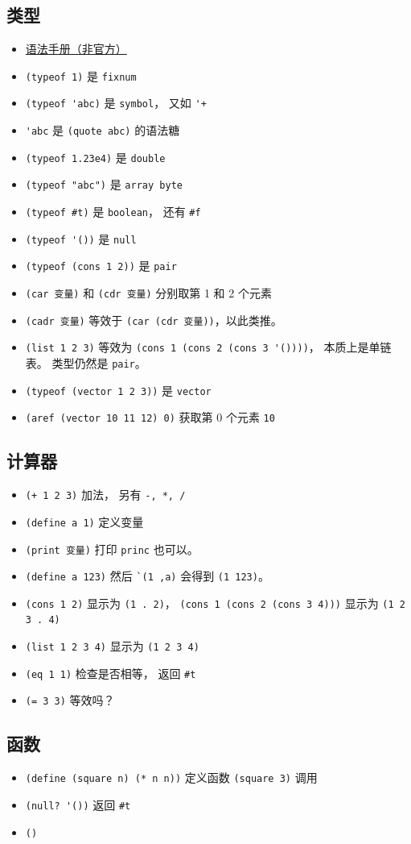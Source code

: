 
\subsection{类型}
\begin{itemize}
\item \href{https://code.google.com/archive/p/femtolisp/wikis/Manual.wiki}{语法手册（非官方）}
\item \verb`(typeof 1)` 是 \verb`fixnum`
\item \verb`(typeof 'abc)` 是 \verb`symbol`， 又如 \verb`'+`
\item \verb`'abc` 是 \verb`(quote abc)` 的语法糖
\item \verb`(typeof 1.23e4)` 是 \verb`double`
\item \verb`(typeof "abc")` 是 \verb`array byte`
\item \verb`(typeof #t)` 是 \verb`boolean`， 还有 \verb`#f`
\item \verb`(typeof '())` 是 \verb`null`
\item \verb`(typeof (cons 1 2))` 是 \verb`pair`
\item \verb`(car 变量)` 和 \verb`(cdr 变量)` 分别取第 1 和 2 个元素
\item \verb`(cadr 变量)` 等效于 \verb`(car (cdr 变量))`，以此类推。
\item \verb`(list 1 2 3)` 等效为 \verb`(cons 1 (cons 2 (cons 3 '())))`， 本质上是单链表。 类型仍然是 \verb`pair`。
\item \verb`(typeof (vector 1 2 3))` 是 \verb`vector`
\item \verb`(aref (vector 10 11 12) 0)` 获取第 0 个元素 \verb`10`

\end{itemize}

\subsection{计算器}
\begin{itemize}
\item \verb`(+ 1 2 3)` 加法， 另有 \verb`-, *, /`
\item \verb`(define a 1)` 定义变量
\item \verb`(print 变量)` 打印 \verb`princ` 也可以。
\item \verb`(define a 123)` 然后 \verb|`(1 ,a)| 会得到 \verb`(1 123)`。
\item \verb`(cons 1 2)` 显示为 \verb`(1 . 2)`， \verb`(cons 1 (cons 2 (cons 3 4)))` 显示为 \verb`(1 2 3 . 4)`
\item \verb`(list 1 2 3 4)` 显示为 \verb`(1 2 3 4)`
\item \verb`(eq 1 1)` 检查是否相等， 返回 \verb`#t`
\item \verb`(= 3 3)` 等效吗？
\end{itemize}

\subsection{函数}
\begin{itemize}
\item \verb`(define (square n) (* n n))` 定义函数 \verb`(square 3)` 调用
\item \verb`(null? '())` 返回 \verb`#t`
\item \verb`()`
\end{itemize}
